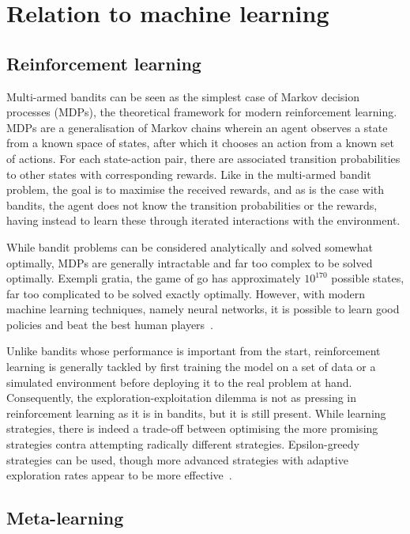 \section{Relation to machine learning}
\subsection{Reinforcement learning}
Multi-armed bandits can be seen as the simplest case of Markov decision processes (MDPs), the theoretical framework for modern reinforcement learning.
MDPs are a generalisation of Markov chains wherein an agent observes a state from a known space of states, after which it chooses an action from a known set of actions.
For each state-action pair, there are associated transition probabilities to other states with corresponding rewards.
Like in the multi-armed bandit problem, the goal is to maximise the received rewards, and as is the case with bandits, the agent does not know the transition probabilities or the rewards, having instead to learn these through iterated interactions with the environment.

While bandit problems can be considered analytically and solved somewhat optimally, MDPs are generally intractable and far too complex to be solved optimally.
Exempli gratia, the game of go has approximately $10^{170}$ possible states, far too complicated to be solved exactly optimally.
However, with modern machine learning techniques, namely neural networks, it is possible to learn good policies and beat the best human players~\autocite{silver2016}.

Unlike bandits whose performance is important from the start, reinforcement learning is generally tackled by first training the model on a set of data or a simulated environment before deploying it to the real problem at hand.
Consequently, the exploration-exploitation dilemma is not as pressing in reinforcement learning as it is in bandits, but it is still present.
While learning strategies, there is indeed a trade-off between optimising the more promising strategies contra attempting radically different strategies.
Epsilon-greedy strategies can be used, though more advanced strategies with adaptive exploration rates appear to be more effective~\autocite{tokic2011}.


\subsection{Meta-learning}
